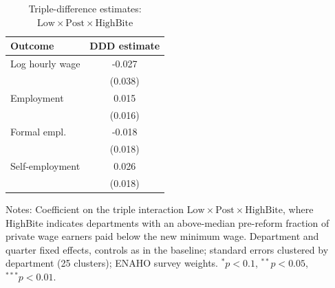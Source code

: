 \begin{table}[!tbp]\centering
\caption{Triple-difference estimates: $\mathrm{Low}\times\mathrm{Post}\times\mathrm{HighBite}$}\label{tab:ddd}
\begin{threeparttable}
\begin{tabular}{lc}
\toprule
Outcome & DDD estimate \\
\midrule
Log hourly wage & -0.027 \\
 & (0.038) \\
Employment & 0.015 \\
 & (0.016) \\
Formal empl. & -0.018 \\
 & (0.018) \\
Self-employment & 0.026 \\
 & (0.018) \\
\bottomrule
\end{tabular}
\begin{tablenotes}\footnotesize
\item Notes: Coefficient on the triple interaction $\mathrm{Low}\times\mathrm{Post}\times\mathrm{HighBite}$, where HighBite indicates departments with an above-median pre-reform fraction of private wage earners paid below the new minimum wage. Department and quarter fixed effects, controls as in the baseline; standard errors clustered by department (25 clusters); ENAHO survey weights. $^{*}p<0.1$, $^{**}p<0.05$, $^{***}p<0.01$.
\end{tablenotes}
\end{threeparttable}\end{table}
